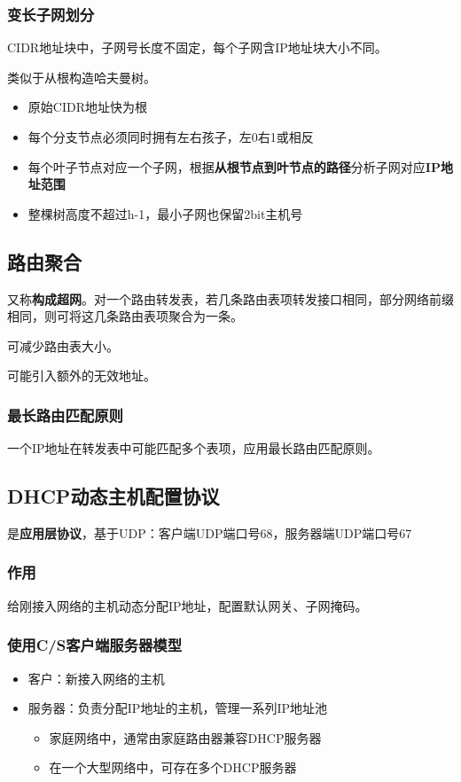 \subsubsection{变长子网划分}
CIDR地址块中，子网号长度不固定，每个子网含IP地址块大小不同。

类似于从根构造哈夫曼树。\begin{itemize}
    \item 原始CIDR地址快为根
    \item 每个分支节点必须同时拥有左右孩子，左0右1或相反
    \item 每个叶子节点对应一个子网，根据\textbf{从根节点到叶节点的路径}分析子网对应\textbf{IP地址范围}
    \item 整棵树高度不超过h-1，最小子网也保留2bit主机号
\end{itemize}


\subsection{路由聚合}
又称\textbf{构成超网}。对一个路由转发表，若几条路由表项转发接口相同，部分网络前缀相同，则可将这几条路由表项聚合为一条。

可减少路由表大小。

可能引入额外的无效地址。

\subsubsection{最长路由匹配原则}
一个IP地址在转发表中可能匹配多个表项，应用最长路由匹配原则。


\subsection{DHCP动态主机配置协议}
是\textbf{应用层协议}，基于UDP：客户端UDP端口号68，服务器端UDP端口号67

\subsubsection{作用}
给刚接入网络的主机动态分配IP地址，配置默认网关、子网掩码。


\subsubsection{使用C/S客户端服务器模型}
\begin{itemize}
    \item 客户：新接入网络的主机
    \item 服务器：负责分配IP地址的主机，管理一系列IP地址池\begin{itemize}
        \item 家庭网络中，通常由家庭路由器兼容DHCP服务器
        \item 在一个大型网络中，可存在多个DHCP服务器
    \end{itemize}
\end{itemize}


